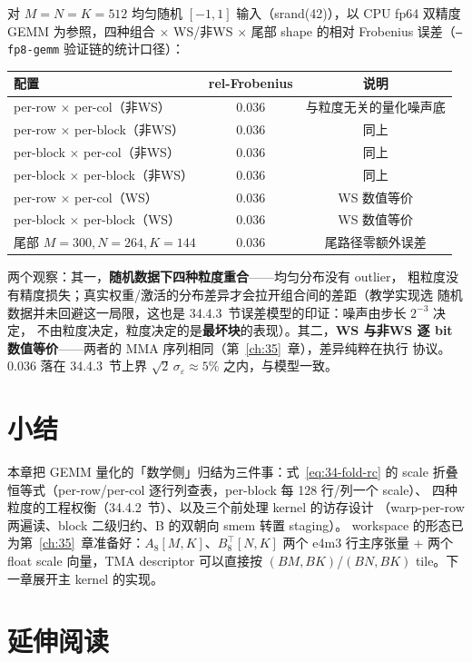 对 $M{=}N{=}K{=}512$ 均匀随机 $[-1,1]$ 输入（srand(42)），以 CPU fp64 双精度
GEMM 为参照，四种组合 $\times$ WS/非WS $\times$ 尾部 shape 的相对 Frobenius
误差（\texttt{--fp8-gemm} 验证链的统计口径）：

\begin{center}
\footnotesize
\begin{tabular}{lcc}
\toprule
配置 & rel-Frobenius & 说明 \\
\midrule
per-row $\times$ per-col（非WS） & 0.036 & 与粒度无关的量化噪声底 \\
per-row $\times$ per-block（非WS） & 0.036 & 同上 \\
per-block $\times$ per-col（非WS） & 0.036 & 同上 \\
per-block $\times$ per-block（非WS） & 0.036 & 同上 \\
per-row $\times$ per-col（WS） & 0.036 & WS 数值等价 \\
per-block $\times$ per-block（WS） & 0.036 & WS 数值等价 \\
尾部 $M{=}300,N{=}264,K{=}144$ & 0.036 & 尾路径零额外误差 \\
\bottomrule
\end{tabular}
\end{center}

两个观察：其一，\textbf{随机数据下四种粒度重合}——均匀分布没有 outlier，
粗粒度没有精度损失；真实权重/激活的分布差异才会拉开组合间的差距（教学实现选
随机数据并未回避这一局限，这也是 34.4.3~节误差模型的印证：噪声由步长 $2^{-3}$ 决定，
不由粒度决定，粒度决定的是\textbf{最坏块}的表现）。其二，\textbf{WS 与非WS
逐 bit 数值等价}——两者的 MMA 序列相同（第~\ref{ch:35}~章），差异纯粹在执行
协议。$0.036$ 落在 34.4.3~节上界 $\sqrt{2}\,\sigma_\varepsilon\approx5\%$
之内，与模型一致。

\section{小结}

本章把 GEMM 量化的「数学侧」归结为三件事：式~\ref{eq:34-fold-rc} 的 scale
折叠恒等式（per-row/per-col 逐行列查表，per-block 每 128 行/列一个 scale）、
四种粒度的工程权衡（34.4.2~节）、以及三个前处理 kernel 的访存设计
（warp-per-row 两遍读、block 二级归约、B 的双朝向 smem 转置 staging）。
workspace 的形态已为第~\ref{ch:35}~章准备好：$A_8[M,K]$、$B_8^{\top}[N,K]$
两个 e4m3 行主序张量 + 两个 float scale 向量，TMA descriptor 可以直接按
$(BM,BK)$/$(BN,BK)$ tile。下一章展开主 kernel 的实现。

\section*{延伸阅读}

